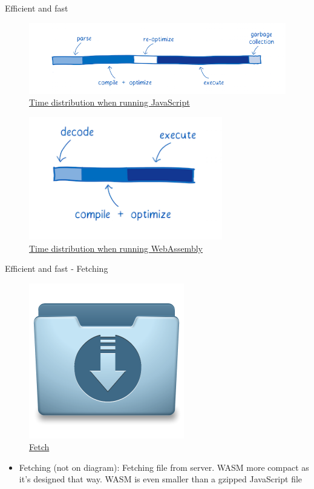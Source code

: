 \documentclass{beamer}
\begin{document}
\begin{frame}{Efficient and fast}
     \begin{figure}
        \includegraphics[scale=0.3]{./images/javascriptgraph.png}
        \caption{\href{https://www.smashingmagazine.com/2017/05/abridged-cartoon-introduction-webassembly/}{Time distribution when running JavaScript}}
    \end{figure}
     \begin{figure}
        \includegraphics[scale=0.4]{./images/wasmgraph.png}
        \caption{\href{https://www.smashingmagazine.com/2017/05/abridged-cartoon-introduction-webassembly/}{Time distribution when running WebAssembly}}
    \end{figure}
\end{frame}

\begin{frame}{Efficient and fast - Fetching}
      \begin{figure}
        \includegraphics[scale=0.2]{./images/file.jpg}
        \caption{\href{https://icon-library.com/icon/download-icon-file-4.html}{Fetch}}
    \end{figure}
\begin{itemize}
    \item Fetching (not on diagram): Fetching file from server. WASM more compact as it's designed that way. WASM is even smaller than a gzipped JavaScript file
\end{itemize}
\end{frame}
\end{document}
